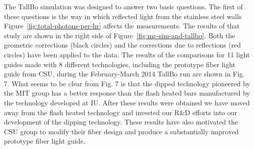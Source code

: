 The TallBo simulation was designed to answer two basic questions.  The first of these questions is the way in which reflected light from the stainless steel walls Figure~\ref{fig:total-photons-per-hr} affects the measurements.  The results of that study are shown in the right side of Figure~\ref{fig:mc-sim-and-tallbo}.  Both the geometric corrections (black circles) and the corrections due to reflections (red circles) have been applied to the data.
The results of the comparisons for 11 light guides made with 8 different technologies, including the prototype fiber light guide from CSU, during the February-March 2014 TallBo run are shown in Fig. 7.  What seems to be clear  from Fig. 7 is that the dipped technology pioneered by the MIT group has a better response than the flash heated bars manufactured by the technology developed at IU.  After these results were obtained we have moved away from the flash heated technology and invested our R\&D efforts into our development of the dipping technology.  These results have also motivated the CSU group to modify their fiber design and produce a substantially improved prototype fiber light guide. 








